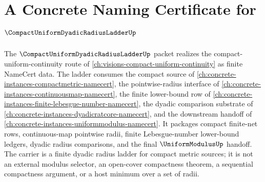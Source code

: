 \chapter{A Concrete Naming Certificate for $\CompactUniformDyadicRadiusLadderUp$}
\label{ch:concrete-instances-compact-uniform-dyadic-radius-ladder-namecert}

The $\CompactUniformDyadicRadiusLadderUp$ packet realizes the compact-uniform-continuity route of \autoref{ch:visions-compact-uniform-continuity} as finite NameCert data. The ladder consumes the compact source of \autoref{ch:concrete-instances-compactmetric-namecert}, the pointwise-radius interface of \autoref{ch:concrete-instances-continuousmap-namecert}, the finite lower-bound row of \autoref{ch:concrete-instances-finite-lebesgue-number-namecert}, the dyadic comparison substrate of \autoref{ch:concrete-instances-dyadicratcore-namecert}, and the downstream handoff of \autoref{ch:concrete-instances-uniformmodulus-namecert}. It packages compact finite-net rows, continuous-map pointwise radii, finite Lebesgue-number lower-bound ledgers, dyadic radius comparisons, and the final $\UniformModulusUp$ handoff. The carrier is a finite dyadic radius ladder for compact metric sources; it is not an external modulus selector, an open-cover compactness theorem, a sequential compactness argument, or a host minimum over a set of radii.

